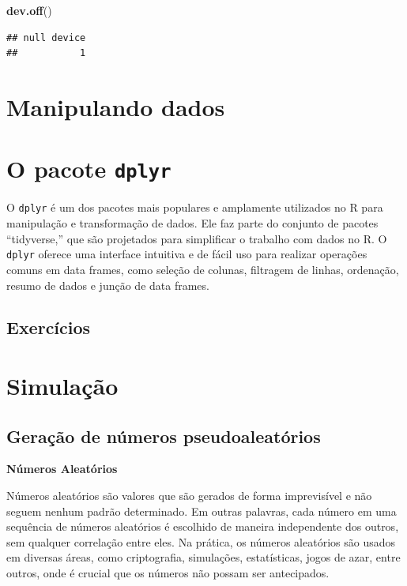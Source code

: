 \documentclass[
]{book}
\newenvironment{Shaded}{\begin{snugshade}}{\end{snugshade}}
\newcommand{\FunctionTok}[1]{\textcolor[rgb]{0.13,0.29,0.53}{\textbf{#1}}}
\newcommand{\NormalTok}[1]{#1}
\begin{document}
\begin{Shaded}
\begin{Highlighting}[]
\FunctionTok{dev.off}\NormalTok{()}
\end{Highlighting}
\end{Shaded}

\begin{verbatim}
## null device 
##           1
\end{verbatim}

\chapter{Manipulando dados}\label{manipulando-dados-1}

\chapter{\texorpdfstring{O pacote \texttt{dplyr}}{O pacote dplyr}}\label{o-pacote-dplyr}

O \texttt{dplyr} é um dos pacotes mais populares e amplamente utilizados no R para manipulação e transformação de dados. Ele faz parte do conjunto de pacotes ``tidyverse,'' que são projetados para simplificar o trabalho com dados no R. O \texttt{dplyr} oferece uma interface intuitiva e de fácil uso para realizar operações comuns em data frames, como seleção de colunas, filtragem de linhas, ordenação, resumo de dados e junção de data frames.

\section{Exercícios}\label{exercuxedcios-10}

\chapter{Simulação}\label{simulauxe7uxe3o}

\section{Geração de números pseudoaleatórios}\label{gerauxe7uxe3o-de-nuxfameros-pseudoaleatuxf3rios}

\textbf{Números Aleatórios}

Números aleatórios são valores que são gerados de forma imprevisível e não seguem nenhum padrão determinado. Em outras palavras, cada número em uma sequência de números aleatórios é escolhido de maneira independente dos outros, sem qualquer correlação entre eles. Na prática, os números aleatórios são usados em diversas áreas, como criptografia, simulações, estatísticas, jogos de azar, entre outros, onde é crucial que os números não possam ser antecipados.
\end{document}
